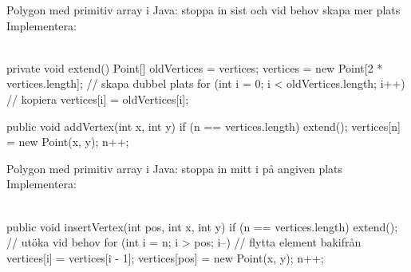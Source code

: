 \begin{Slide}{Polygon med primitiv array i Java: stoppa in sist och vid behov skapa mer plats}\SlideFontSmall
Implementera:\\
\ifswedish{}\else{}\fi\\
\ifswedish{}\else{}\fi
\pause
\begin{Code}[numberstyle=,numbers=left,language=Java]
    private void extend(){
        Point[] oldVertices = vertices;
        vertices = new Point[2 * vertices.length]; // skapa dubbel plats
        for (int i = 0; i < oldVertices.length; i++) {  // kopiera
            vertices[i] = oldVertices[i];
        }
    }

    public void addVertex(int x, int y) {
        if (n == vertices.length) extend();
        vertices[n] = new Point(x, y);
        n++;
    }
\end{Code}
\end{Slide}


\begin{Slide}{Polygon med primitiv array i Java: stoppa in mitt i på angiven plats }\SlideFontSmall
Implementera:\\
\ifswedish{}\else{}\fi\\
\pause
\begin{Code}[numberstyle=,numbers=left,language=Java]
    public void insertVertex(int pos, int x, int y) {
        if (n == vertices.length) extend();   // utöka vid behov
        for (int i = n; i > pos; i--) {       // flytta element bakifrån
            vertices[i] = vertices[i - 1];
        }
        vertices[pos] = new Point(x, y);
        n++;
    }
\end{Code}
\end{Slide}




